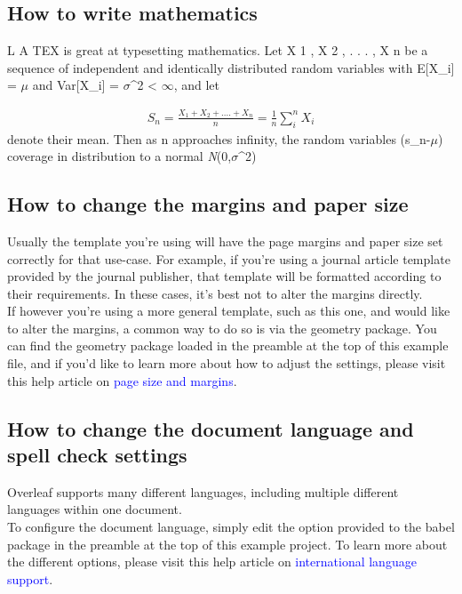 \documentclass{article}
\begin{document}
\subsection{How to write mathematics}
L A TEX is great at typesetting mathematics. Let X 1 , X 2 , . . . , X n be a sequence of independent and
identically distributed random variables with E[X_{i}] = $\mu$ and  Var[X_{i}] = $\sigma$^{2} < $\infty$, and let

\begin{align*}
	S_{n}=\frac{X_{1}+X_{2}+....+X_{n}}{n}=\frac{1}{n}\sum_{i}^{n} X_{i}
\end{align*}
denote their mean. Then as n approaches infinity, the random variables (s_{n}-$\mu$) coverage in
distribution to a normal \textit{N}(0,$\sigma$^{2})

\subsection{How to change the margins and paper size}
Usually the template you’re using will have the page margins and paper size set correctly for that
use-case. For example, if you’re using a journal article template provided by the journal publisher,
that template will be formatted according to their requirements. In these cases, it’s best not to alter
the margins directly.\\

If however you’re using a more general template, such as this one, and would like to alter the
margins, a common way to do so is via the geometry package. You can find the geometry package
loaded in the preamble at the top of this example file, and if you’d like to learn more about how to
adjust the settings, please visit this help article on \textcolor{blue}{page size and margins}.

\subsection{How to change the document language and spell check settings}
Overleaf supports many different languages, including multiple different languages within one document.\\

To configure the document language, simply edit the option provided to the babel package in the
preamble at the top of this example project. To learn more about the different options, please visit
this help article on \textcolor{blue}{international language support}.\\
\end{document}
